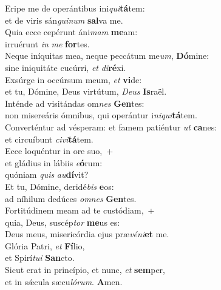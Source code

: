 \evenverse Eripe me de operántibus ini\textit{qui}\textbf{tá}tem:~\*\\
\evenverse et de viris sán\textit{gui}\textit{num} \textbf{sal}va me.\\
\oddverse Quia ecce cepérunt áni\textit{mam} \textbf{me}am:~\*\\
\oddverse irruérunt \textit{in} \textit{me} \textbf{for}tes.\\
\evenverse Neque iníquitas mea, neque peccátum me\textit{um}, \textbf{Dó}mine:~\*\\
\evenverse sine iniquitáte cucúrri, \textit{et} \textit{di}\textbf{ré}xi.\\
\oddverse Exsúrge in occúrsum meum, \textit{et} \textbf{vi}de:~\*\\
\oddverse et tu, Dómine, Deus virtútum, \textit{De}\textit{us} \textbf{Is}raël.\\
\evenverse Inténde ad visitándas om\textit{nes} \textbf{Gen}tes:~\*\\
\evenverse non misereáris ómnibus, qui operántur i\textit{ni}\textit{qui}\textbf{tá}tem.\\
\oddverse Converténtur ad vésperam: et famem patiéntur \textit{ut} \textbf{ca}nes:~\*\\
\oddverse et circuíbunt \textit{ci}\textit{vi}\textbf{tá}tem.\\
\evenverse Ecce loquéntur in ore suo,~+\\
\evenverse  et gládius in lábiis \textit{e}\textbf{ó}rum:~\*\\
\evenverse quóniam \textit{quis} \textit{au}\textbf{dí}vit?\\
\oddverse Et tu, Dómine, deridé\textit{bis} \textbf{e}os:~\*\\
\oddverse ad níhilum dedúces \textit{om}\textit{nes} \textbf{Gen}tes.\\
\evenverse Fortitúdinem meam ad te custódiam,~+\\
\evenverse  quia, Deus, suscép\textit{tor} \textbf{me}us es:~\*\\
\evenverse Deus meus, misericórdia ejus præ\textit{vé}\textit{ni}\textbf{et} me.\\
\oddverse Glória Patri, \textit{et} \textbf{Fí}lio,~\*\\
\oddverse et Spirí\textit{tu}\textit{i} \textbf{San}cto.\\
\evenverse Sicut erat in princípio, et nunc, \textit{et} \textbf{sem}per,~\*\\
\evenverse et in sǽcula sæcu\textit{ló}\textit{rum}. \textbf{A}men.\\

